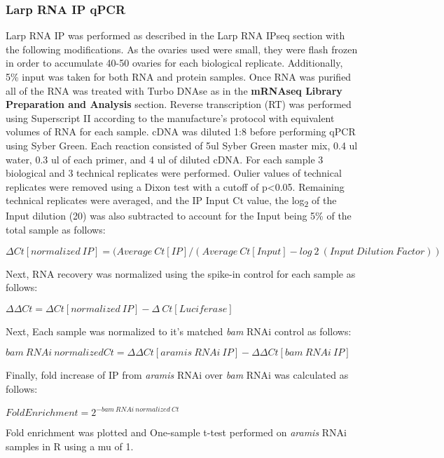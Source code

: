 \documentclass[12pt,oneside]{reedthesis}
\begin{document}
\hypertarget{larp-rna-ip-qpcr}{%
\subsubsection{Larp RNA IP qPCR}\label{larp-rna-ip-qpcr}}

Larp RNA IP was performed as described in the Larp RNA IPseq section with the following modifications. As the ovaries used were small, they were flash frozen in order to accumulate 40-50 ovaries for each biological replicate. Additionally, 5\% input was taken for both RNA and protein samples. Once RNA was purified all of the RNA was treated with Turbo DNAse as in the \textbf{mRNAseq Library Preparation and Analysis} section. Reverse transcription (RT) was performed using Superscript II according to the manufacture's protocol with equivalent volumes of RNA for each sample. cDNA was diluted 1:8 before performing qPCR using Syber Green. Each reaction consisted of 5ul Syber Green master mix, 0.4 ul water, 0.3 ul of each primer, and 4 ul of diluted cDNA. For each sample 3 biological and 3 technical replicates were performed. Oulier values of technical replicates were removed using a Dixon test with a cutoff of p\textless0.05. Remaining technical replicates were averaged, and the IP Input Ct value, the log\textsubscript{2} of the Input dilution (20) was also subtracted to account for the Input being 5\% of the total sample as follows:

\(\Delta Ct[normalized\ IP] = (Average\ Ct[IP]/(Average\ Ct[Input] - log~2~(Input\ Dilution\ Factor))\)

Next, RNA recovery was normalized using the spike-in control for each sample as follows:

\(\Delta \Delta Ct = \Delta Ct[normalized\ IP]-\Delta\ Ct[Luciferase]\)

Next, Each sample was normalized to it's matched \emph{bam} RNAi control as follows:

\(bam\ RNAi\ normalized Ct= \Delta \Delta Ct[aramis\ RNAi\ IP] - \Delta \Delta Ct[bam\ RNAi\ IP]\)

Finally, fold increase of IP from \emph{aramis} RNAi over \emph{bam} RNAi was calculated as follows:

\(Fold Enrichment = 2^{-bam\ RNAi\ normalized\ Ct}\)

Fold enrichment was plotted and One-sample t-test performed on \emph{aramis} RNAi samples in R using a mu of 1.
\end{document}
